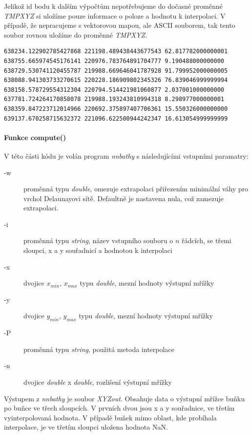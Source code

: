 \documentclass[12pt,a4paper]{article}
\begin{document}
Jelikož id bodu k dalším výpočtům nepotřebujeme do dočasné proměnné
\emph{TMPXYZ} si uložíme pouze informace o poloze a hodnotu k
interpolaci. V případě, že nepracujeme s vektorovou mapou, ale ASCII
souborem, tak tento soubor rovnou uložíme do proměnné \emph{TMPXYZ}.

\newpage
\lstset{basicstyle=\footnotesize}
\begin{lstlisting}[caption={Pomocný soubor TMPXYZ}]
638234.122902785427868 221198.489438443677543 62.817782000000001
638755.665974545176141 220976.783764891704777 9.190488000000000
638729.530741120455787 219988.669646041787928 91.799952000000005
638088.941303733270615 220228.186909802345326 76.839046999999994
638158.578729554312304 220794.514421981060877 2.037001000000000
637781.724264170858078 219988.193243810994318 8.298977000000001
638359.847223712014966 220692.375897407706361 15.550326000000000
639137.670258715632372 221096.622500944242347 16.613054999999999
\end{lstlisting}

\bigskip
\paragraph{Funkce compute()}

V této části kódu je volán program \emph{nnbathy} s následujícími
vstupními paramatry:
\begin{description}
\item[-w]{proměnná typu \emph{double}, omezuje extrapolaci přiřezením minimální váhy pro vrchol Delaunayovi sítě. Defaultně je nastavena nula, což zamezuje extrapolaci.}
\item[-i]{proměnná typu \emph{string}, název vstupního souboru o $n$ řádcích, se třemi sloupci, x a y souřadnicí a hodnotou k interpolaci}
\item[-x]{dvojice $x_{min}$, $x_{max}$ typu \emph{double}, mezní hodnoty výstupní mřížky}
\item[-y]{dvojice $y_{min}$, $y_{max}$ typu \emph{double}, mezní hodnoty výstupní mřížky}
\item[-P]{proměnná typu \emph{string}, použitá metoda interpolace}
\item[-n]{dvojice \emph{double} x \emph{double}, rozlišení výstupní mřížky}
\end{description}

Výstupem z \emph{nnbathy} je soubor \emph{XYZout}. Obsahuje data o
výstupní mřížce buňku po buňce ve třech sloupcích. V prvních dvou jsou
x a y souřadnice, ve třetím vyinterpolovaná hodnota. V případě buňek
mimo oblast, kde probíhala interpolace, je ve třetím sloupci uložena
hodnota NaN.
\end{document}
